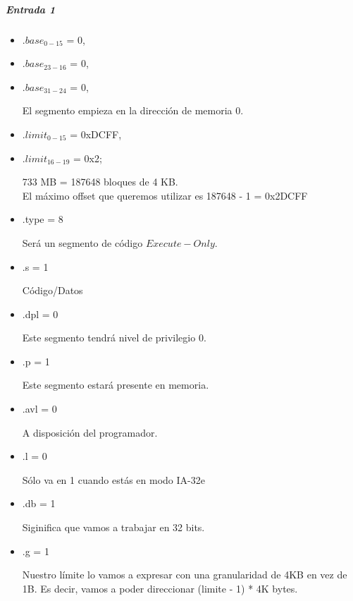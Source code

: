 \subparagraph*{Entrada 1}
\begin{itemize}
	
    \item $.base_{0-15}$ = 0,

    \item $.base_{23-16}$ = 0,
    \item $.base_{31-24}$ = 0,
    
El segmento empieza en la dirección de memoria 0.
        
    \item $.limit_{0-15}$ = 0xDCFF,
    \item $.limit_{16-19}$ = 0x2;

733 MB = 187648 bloques de 4 KB.
\\ El máximo offset que queremos utilizar es 187648 - 1 = 0x2DCFF 
    
    \item .type = 8
        
Será un segmento de código $Execute-Only$.
        
    \item .s  = 1
        
Código/Datos 
        
    \item .dpl = 0
        
Este segmento tendrá nivel de privilegio 0.

    \item .p = 1
        
Este segmento estará presente en memoria.  
    
    \item .avl = 0
        
A disposición del programador.


    \item .l = 0
        
Sólo va en 1 cuando estás en modo IA-32e 

    \item .db = 1
        
Siginifica que vamos a trabajar en 32 bits. 

    \item .g = 1

Nuestro límite lo vamos a expresar con una granularidad de 4KB en vez de 1B. Es decir, vamos a poder direccionar (limite - 1) * 4K bytes.

\end{itemize}

